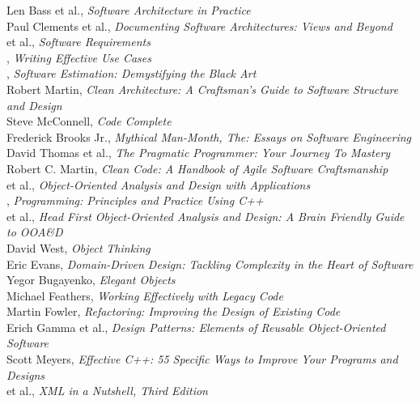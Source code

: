 \documentclass[nobrand,anonymous,nodate,nosecurity]{huawei}
\begin{document}
\begin{multicols}{2}\small\raggedright
Len Bass et al., \emph{Software Architecture in Practice}\\[3pt]
Paul Clements et al., \emph{Documenting Software Architectures: Views and Beyond}\\[3pt]
 et al., \emph{Software Requirements}\\[3pt]
{}, \emph{Writing Effective Use Cases}\\[3pt]
{}, \emph{Software Estimation: Demystifying the Black Art}\\[3pt]
{Robert Martin}, \emph{Clean Architecture: A Craftsman's Guide to Software Structure and Design}\\[3pt]
{Steve McConnell}, \emph{Code Complete}\\[3pt]
{Frederick Brooks Jr.}, \emph{Mythical Man-Month, The: Essays on Software Engineering}\\[3pt]
{David Thomas et al.}, \emph{The Pragmatic Programmer: Your Journey To Mastery}\\[3pt]
{Robert C. Martin}, \emph{Clean Code: A Handbook of Agile Software Craftsmanship}\\[3pt]
{ et al.}, \emph{Object-Oriented Analysis and Design with Applications}\\[3pt]
{}, \emph{Programming: Principles and Practice Using C++}\\[3pt]
{ et al.}, \emph{Head First Object-Oriented Analysis and Design: A Brain Friendly Guide to OOA\&D}\\[3pt]
{David West}, \emph{Object Thinking}\\[3pt]
{Eric Evans}, \emph{Domain-Driven Design: Tackling Complexity in the Heart of Software}\\[3pt]
{Yegor Bugayenko}, \emph{Elegant Objects}\\[3pt]
{Michael Feathers}, \emph{Working Effectively with Legacy Code}\\[3pt]
{Martin Fowler}, \emph{Refactoring: Improving the Design of Existing Code}\\[3pt]
{Erich Gamma et al.}, \emph{Design Patterns: Elements of Reusable Object-Oriented Software}\\[3pt]
{Scott Meyers}, \emph{Effective C++: 55 Specific Ways to Improve Your Programs and Designs}\\[3pt]
{ et al.}, \emph{XML in a Nutshell, Third Edition}\\[3pt]

\end{multicols}
\end{document}
